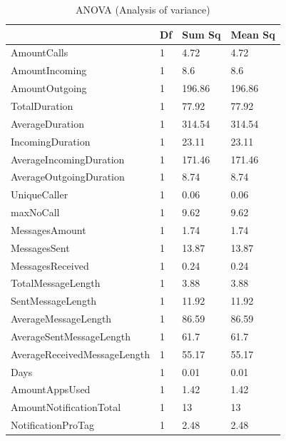\begin{table}[]
\centering
\caption{ANOVA (Analysis of variance)}
\label{anova}
\begin{tabular}{@{}llll@{}}
\toprule
                             & Df & Sum Sq & Mean Sq \\ \midrule
AmountCalls                  & 1  & 4.72   & 4.72    \\
AmountIncoming               & 1  & 8.6    & 8.6     \\
AmountOutgoing               & 1  & 196.86 & 196.86  \\
TotalDuration                & 1  & 77.92  & 77.92   \\
AverageDuration              & 1  & 314.54 & 314.54  \\
IncomingDuration             & 1  & 23.11  & 23.11   \\
AverageIncomingDuration      & 1  & 171.46 & 171.46  \\
AverageOutgoingDuration      & 1  & 8.74   & 8.74    \\
UniqueCaller                 & 1  & 0.06   & 0.06    \\
maxNoCall                    & 1  & 9.62   & 9.62    \\
MessagesAmount               & 1  & 1.74   & 1.74    \\
MessagesSent                 & 1  & 13.87  & 13.87   \\
MessagesReceived             & 1  & 0.24   & 0.24    \\
TotalMessageLength           & 1  & 3.88   & 3.88    \\
SentMessageLength            & 1  & 11.92  & 11.92   \\
AverageMessageLength         & 1  & 86.59  & 86.59   \\
AverageSentMessageLength     & 1  & 61.7   & 61.7    \\
AverageReceivedMessageLength & 1  & 55.17  & 55.17   \\
Days                         & 1  & 0.01   & 0.01    \\
AmountAppsUsed               & 1  & 1.42   & 1.42    \\
AmountNotificationTotal      & 1  & 13     & 13      \\
NotificationProTag           & 1  & 2.48   & 2.48    \\ \bottomrule
\end{tabular}
\end{table}

